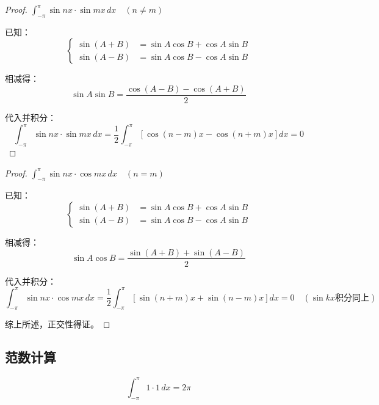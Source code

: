 \documentclass[12pt,a4paper]{article}
\numberwithin{subsection}{section}   %
\numberwithin{subsubsection}{subsection}
\theoremstyle{plain}
\theoremstyle{definition}
\theoremstyle{remark}
\theoremstyle{remark}
\begin{document}
\begin{proof}\(\int_{-\pi}^{\pi} \sin nx \cdot \sin mx \, dx  \quad (n \neq m)\)

已知：
\begin{equation}
	\left\{
	\begin{aligned}
		\sin(A + B) &= \sin A \cos B + \cos A \sin B  \\[8pt]
		\sin(A - B) &= \sin A \cos B - \cos A \sin B
	\end{aligned}
	\right.
\end{equation}

相减得：
\begin{equation}
	\sin A \sin B = \frac{\cos(A - B) - \cos(A + B)}{2}
\end{equation}

代入并积分：
\begin{equation}
	\int_{-\pi}^{\pi} \sin nx \cdot \sin mx \, dx = \frac{1}{2} \int_{-\pi}^{\pi} \left[ \cos(n - m)x - \cos(n + m)x \right] dx = 0 
\end{equation}
\end{proof}


\begin{proof} \(\int_{-\pi}^{\pi} \sin nx \cdot \cos mx \, dx  \quad (n = m )\)

已知：
\begin{equation}
	\left\{
	\begin{aligned}
		\sin(A + B) &= \sin A \cos B + \cos A \sin B  \\[8pt]
		\sin(A - B) &= \sin A \cos B - \cos A \sin B
	\end{aligned}
	\right.
\end{equation}

相减得：
\begin{equation}
	\sin A \cos B = \frac{\sin(A + B) + \sin(A - B)}{2}
\end{equation}

代入并积分：
\begin{equation}
	\int_{-\pi}^{\pi} \sin nx \cdot \cos mx \, dx = \frac{1}{2} \int_{-\pi}^{\pi} \left[ \sin(n + m)x + \sin(n - m)x \right] dx = 0 \quad (\sin kx 积分同上)
\end{equation}

综上所述，正交性得证。
\end{proof}

\subsection{范数计算}
\begin{equation}
	\int_{-\pi}^{\pi} 1 \cdot 1 \, dx = 2\pi
\end{equation}
\end{document}
